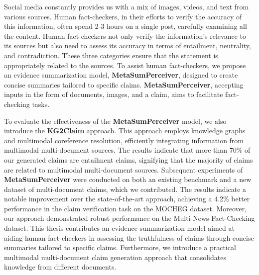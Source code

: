 Social media constantly provides us with a mix of images, videos, and text from various sources. Human fact-checkers, in their efforts to verify the accuracy of this information, often spend 2-3 hours on a single post, carefully examining all the content. Human fact-checkers not only verify the information's relevance to its sources but also need to assess its accuracy in terms of entailment, neutrality, and contradiction. These three categories ensure that the statement is appropriately related to the sources. To assist human fact-checkers, we propose an evidence summarization model, \textbf{MetaSumPerceiver},  designed to create concise summaries tailored to specific claims. \textbf{MetaSumPerceiver}, accepting inputs in the form of documents, images, and a claim, aims to facilitate fact-checking tasks.
 
To evaluate the effectiveness of the \textbf{MetaSumPerceiver} model, we also introduce the \textbf{KG2Claim} approach. This approach employs knowledge graphs and multimodal coreference resolution, efficiently integrating information from multimodal multi-document sources. The results indicate that more than 70\% of our generated claims are entailment claims, signifying that the majority of claims are related to multimodal multi-document sources. Subsequent experiments of \textbf{MetaSumPerceiver} were conducted on both an existing benchmark and a new dataset of multi-document claims, which we contributed. The results indicate a notable improvement over the state-of-the-art approach, achieving a 4.2\% better performance in the claim verification task on the MOCHEG dataset. Moreover, our approach demonstrated robust performance on the Multi-News-Fact-Checking dataset. This thesis contributes an evidence summarization model aimed at aiding human fact-checkers in assessing the truthfulness of claims through concise summaries tailored to specific claims. Furthermore, we introduce a practical multimodal multi-document claim generation approach that consolidates knowledge from different documents.